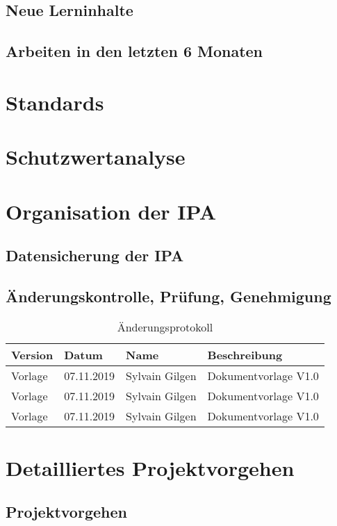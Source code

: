 \section{Neue Lerninhalte}
\section{Arbeiten in den letzten 6 Monaten}


\chapter{Standards}

\chapter{Schutzwertanalyse}

\chapter{Organisation der IPA}
\section{Datensicherung der IPA}
\section{Änderungskontrolle, Prüfung, Genehmigung}
\begin{table}[h!]
    \begin{tabular}{|L{0.1\textwidth}|L{0.23\textwidth}|L{0.23\textwidth}|L{0.33\textwidth}|}
        \hline
        Version & Datum & Name & Beschreibung \\[11pt]
        \hline
        Vorlage & 07.11.2019 & Sylvain Gilgen & Dokumentvorlage V1.0\\
        \hline
        Vorlage & 07.11.2019 & Sylvain Gilgen & Dokumentvorlage V1.0\\
        \hline
        Vorlage & 07.11.2019 & Sylvain Gilgen & Dokumentvorlage V1.0\\
        \hline
    \end{tabular}
    \caption{Änderungsprotokoll}
\end{table}
\chapter{Detailliertes Projektvorgehen}
\section{Projektvorgehen}
